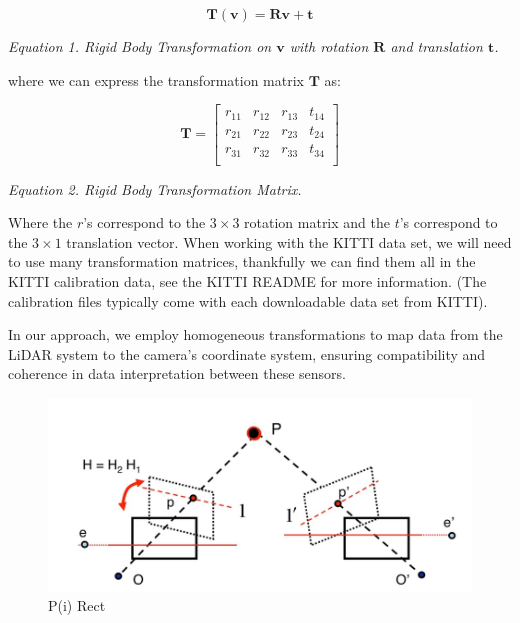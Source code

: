 \documentclass[letterpaper, 10 pt, conference]{ieeeconf}  %
\begin{document}
\begin{equation}
\mathbf{T}(\mathbf{v}) = \mathbf{Rv} + \mathbf{t}
\label{eq:rigid_body_transformation}
\end{equation}

\textit{Equation 1. Rigid Body Transformation on \( \mathbf{v} \) with rotation \( \mathbf{R} \) and translation \( \mathbf{t} \).}


where we can express the transformation matrix \( \mathbf{T} \) as:

\begin{equation}
\mathbf{T} = \begin{bmatrix}
r_{11} & r_{12} & r_{13} & t_{14} \\
r_{21} & r_{22} & r_{23} & t_{24} \\
r_{31} & r_{32} & r_{33} & t_{34} \\
\end{bmatrix}
\label{eq:transformation_matrix}
\end{equation}

\textit{Equation 2. Rigid Body Transformation Matrix.}
	


Where the \( r \)'s correspond to the \( 3 \times 3 \) rotation matrix and the \( t \)'s correspond to the \( 3 \times 1 \) translation vector. When working with the KITTI data set, we will need to use many transformation matrices, thankfully we can find them all in the KITTI calibration data, see the KITTI README for more information. (The calibration files typically come with each downloadable data set from KITTI).


In our approach, we employ homogeneous transformations to map data from the LiDAR system to the camera's coordinate system, ensuring compatibility and coherence in data interpretation between these sensors.

\begin{figure}[htbp]
  \centering
  \includegraphics[width=\linewidth]{rigidbodytran.png}
  \caption{P(i) Rect}
  \label{P(i) Rect}
\end{figure}
\end{document}
